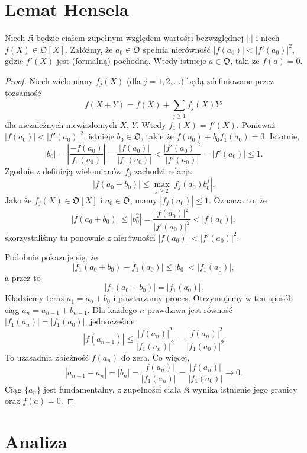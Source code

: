 \section{Lemat Hensela}

\begin{twierdzenie}
	Niech $\mathfrak K$ będzie ciałem zupełnym względem wartości bezwzględnej $|\cdot|$ i niech $f(X) \in \mathfrak O[X]$.
	Załóżmy, że $a_0 \in \mathfrak O$ spełnia nierówność $|f(a_0)| < |f'(a_0)|^2$, gdzie $f'(X)$ jest (formalną) pochodną.
	Wtedy istnieje $a \in \mathfrak O$, taki że $f(a) = 0$.
\end{twierdzenie}

\begin{proof}
	Niech wielomiany $f_j(X)$ (dla $j = 1, 2, \ldots$) będą zdefiniowane przez tożsamość
	\[
		f(X + Y) = f(X) + \sum_{j \ge 1} f_j(X) Y^j
	\]
	dla niezależnych niewiadomych $X$, $Y$.
	Wtedy $f_1(X) = f'(X)$.
	Ponieważ $|f(a_0)| < |f'(a_0)|^2$, istnieje $b_0 \in \mathfrak O$, takie że $f(a_0) + b_0 f_1(a_0) = 0$.
	Istotnie,
	\[
		|b_0| = \left|\frac{- f(a_0)}{f_1(a_0)} \right| = \frac{|f(a_0)|}{|f_1(a_0)|} < \frac{|f'(a_0)|^2}{|f'(a_0)|} = |f'(a_0)| \le 1.
	\]
	Zgodnie z definicją wielomianów $f_j$ zachodzi relacja
	\[
		|f(a_0 + b_0)| \le \max_{j \ge 2} |f_j(a_0) b_0^j|.
	\]
	Jako że $f_j(X) \in \mathfrak O[X]$ i $a_0 \in \mathfrak O$, mamy $|f_j(a_0)| \le 1$.
	Oznacza to, że 
	\[
		|f(a_0 + b_0)| \le |b_0^2| = \frac{|f(a_0)|^2}{|f'(a_0)|^2} < |f(a_0)|,
	\]
	skorzystaliśmy tu ponownie z nierówności $|f(a_0)| < |f'(a_0)|^2$.

	Podobnie pokazuje się, że
	\[
		|f_1(a_0 + b_0) - f_1(a_0)| \le |b_0| < |f_1(a_0)|,
	\]
	a przez to
	\[
		|f_1(a_0 + b_0)| = |f_1(a_0)|.
	\]
	Kładziemy teraz $a_1 = a_0 + b_0$ i powtarzamy proces.
	Otrzymujemy w ten sposób ciąg $a_n = a_{n- 1} + b_{n- 1}$.
	Dla każdego $n$ prawdziwa jest równość $|f_1(a_n)| = |f_1(a_0)|$, jednocześnie
	\[
		|f(a_{n+1})| \le \frac{|f(a_n)|^2}{|f_1(a_n)|^2} = \frac{|f(a_n)|^2}{|f_1(a_0)|^2} %
	\]
	To uzasadnia zbieżność $f(a_n)$ do zera.
	Co więcej,
	\[
		|a_{n+1} - a_n| = |b_n| = \frac{|f(a_n)|}{|f_1(a_n)|} = \frac{|f(a_n)|}{|f_1(a_0)|} \to 0.
	\]
	Ciąg $\{a_n\}$ jest fundamentalny, z zupełności ciała $\mathfrak K$ wynika istnienie jego granicy oraz $f(a) = 0$.
\end{proof}

\section{Analiza}

